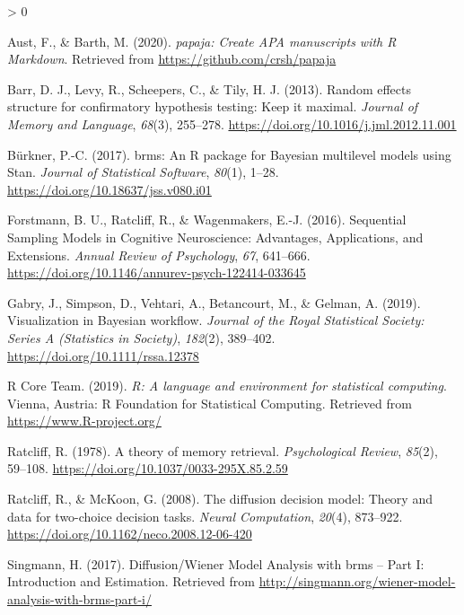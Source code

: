 \documentclass[
  11pt,
  english,
  ,doc,floatsintext]{apa6}
\newlength{\cslhangindent}
\newenvironment{CSLReferences}[2] %
 {%
  \setlength{\parindent}{0pt}
  \ifodd #1 \everypar{\setlength{\hangindent}{\cslhangindent}}\ignorespaces\fi
  \ifnum #2 > 0
  \setlength{\parskip}{#2\baselineskip}
  \fi
 }%
 {}
\begin{document}
\hypertarget{refs}{}
\begin{CSLReferences}{1}{0}
\leavevmode\hypertarget{ref-R-papaja}{}%
Aust, F., \& Barth, M. (2020). \emph{{papaja}: {Create} {APA} manuscripts with {R Markdown}}. Retrieved from \url{https://github.com/crsh/papaja}

\leavevmode\hypertarget{ref-barr_random_2013-1}{}%
Barr, D. J., Levy, R., Scheepers, C., \& Tily, H. J. (2013). Random effects structure for confirmatory hypothesis testing: {Keep} it maximal. \emph{Journal of Memory and Language}, \emph{68}(3), 255--278. \url{https://doi.org/10.1016/j.jml.2012.11.001}

\leavevmode\hypertarget{ref-R-brms_a}{}%
Bürkner, P.-C. (2017). {brms}: An {R} package for {Bayesian} multilevel models using {Stan}. \emph{Journal of Statistical Software}, \emph{80}(1), 1--28. \url{https://doi.org/10.18637/jss.v080.i01}

\leavevmode\hypertarget{ref-forstmann_sequential_2016}{}%
Forstmann, B. U., Ratcliff, R., \& Wagenmakers, E.-J. (2016). Sequential {Sampling} {Models} in {Cognitive} {Neuroscience}: {Advantages}, {Applications}, and {Extensions}. \emph{Annual Review of Psychology}, \emph{67}, 641--666. \url{https://doi.org/10.1146/annurev-psych-122414-033645}

\leavevmode\hypertarget{ref-gabry_visualization_2019}{}%
Gabry, J., Simpson, D., Vehtari, A., Betancourt, M., \& Gelman, A. (2019). Visualization in {Bayesian} workﬂow. \emph{Journal of the Royal Statistical Society: Series A (Statistics in Society)}, \emph{182}(2), 389--402. \url{https://doi.org/10.1111/rssa.12378}

\leavevmode\hypertarget{ref-R-base}{}%
R Core Team. (2019). \emph{R: A language and environment for statistical computing}. Vienna, Austria: R Foundation for Statistical Computing. Retrieved from \url{https://www.R-project.org/}

\leavevmode\hypertarget{ref-ratcliff_theory_1978}{}%
Ratcliff, R. (1978). A theory of memory retrieval. \emph{Psychological Review}, \emph{85}(2), 59--108. \url{https://doi.org/10.1037/0033-295X.85.2.59}

\leavevmode\hypertarget{ref-ratcliff_diffusion_2008}{}%
Ratcliff, R., \& McKoon, G. (2008). The diffusion decision model: Theory and data for two-choice decision tasks. \emph{Neural Computation}, \emph{20}(4), 873--922. \url{https://doi.org/10.1162/neco.2008.12-06-420}

\leavevmode\hypertarget{ref-singmann_diffusionux2fwiener_2017}{}%
Singmann, H. (2017). Diffusion/{Wiener} {Model} {Analysis} with brms -- {Part} {I}: {Introduction} and {Estimation}. Retrieved from \url{http://singmann.org/wiener-model-analysis-with-brms-part-i/}


\end{CSLReferences}
\end{document}
